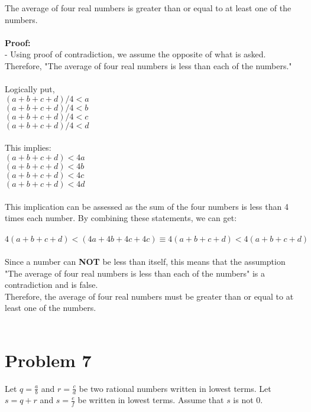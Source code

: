 \documentclass{amsart}
\theoremstyle{definition}
\theoremstyle{Exercise}
\theoremstyle{remark}
\theoremstyle{rule}
\numberwithin{equation}{section}
\begin{document}
The average of four real numbers is greater than or equal to at least one of the numbers.
\\\\
\textbf{Proof:}\\
- Using proof of contradiction, we assume the opposite of what is asked. Therefore, "The average of four real numbers is less than each of the numbers."
\\\\
Logically put,\\
$(a + b + c + d)/ 4 < a$\\
$(a + b + c + d)/ 4 < b$\\
$(a + b + c + d)/ 4 < c$\\
$(a + b + c + d)/ 4 < d$
\\\\
This implies:\\
$(a + b + c + d) < 4a$\\
$(a + b + c + d) < 4b$\\
$(a + b + c + d) < 4c$\\
$(a + b + c + d) < 4d$
\\\\
This implication can be assessed as the sum of the four numbers is less than 4 times each number. By combining these statements, we can get:
\\\\
$4(a + b + c + d) < (4a + 4b + 4c + 4c) \equiv 4(a + b + c + d) < 4(a + b + c + d)$
\\\\
Since a number can \textbf{NOT} be less than itself, this means that the assumption "The average of four real numbers is less than each of the numbers" is a contradiction and is false.\\
Therefore, the average of four real numbers must be greater than or equal to at least one of the numbers. \qedsymbol
\\\\



 \newpage
\vspace*{0.5in}
\section*{Problem 7}

Let $\displaystyle q = \frac{a}{b}$ and $\displaystyle r = \frac{c}{d}$ be two rational numbers written in lowest terms. Let $s = q + r$ and $\displaystyle s = \frac{e}{f}$ be written in lowest terms. Assume that $s$ is not $0$.\\
\end{document}
